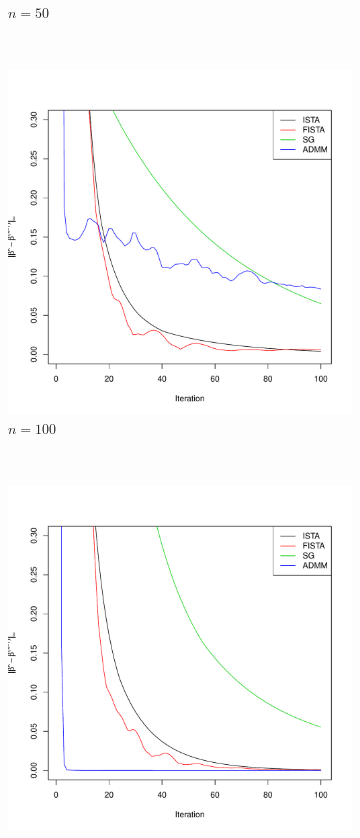 \documentclass[12pt, leqno]{article}
\theoremstyle{remark}
\begin{document}
\begin{figure}[H]
\begin{subfigure}[b]{0.4\textwidth}
        \caption{$n=50$}
        \label{fig:50}
    \end{subfigure}
\\
    \begin{subfigure}[b]{0.4\textwidth}
        \includegraphics[width=\textwidth]{100cvgc.pdf}
        \caption{$n=100$}
        \label{fig:100}
    \end{subfigure}
~
    \begin{subfigure}[b]{0.4\textwidth}
        \includegraphics[width=\textwidth]{500cvgc.pdf}

\end{subfigure}
\end{figure}
\end{document}
